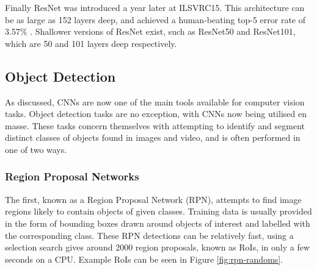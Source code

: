 Finally ResNet was introduced a year later at ILSVRC15. This architecture can be as large as 152 layers deep, and achieved a human-beating top-5 error rate of 3.57\% \cite{he_deep_2015}. Shallower versions of ResNet exist, such as ResNet50 and ResNet101, which are 50 and 101 layers deep respectively. 

\subsection{Object Detection}\label{ch:Background,sec:objectDetection}
As discussed, CNNs are now one of the main tools available for computer vision tasks. Object detection tasks are no exception, with CNNs now being utilised en masse. These tasks concern themselves with attempting to identify and segment distinct classes of objects found in images and video, and is often performed in one of two ways. 

\subsubsection{Region Proposal Networks}\label{ch:Background,sec:objectDetection,sub:RPN}
The first, known as a Region Proposal Network (RPN), attempts to find image regions likely to contain objects of given classes. Training data is usually provided in the form of bounding boxes drawn around objects of interest and labelled with the corresponding class. These RPN detections can be relatively fast, using a selection search \cite{uijlings_selective_2013} gives around 2000 region proposals, known as RoIs, in only a few seconds on a CPU. Example RoIs can be seen in Figure \ref{fig:rpn-randoms}.

